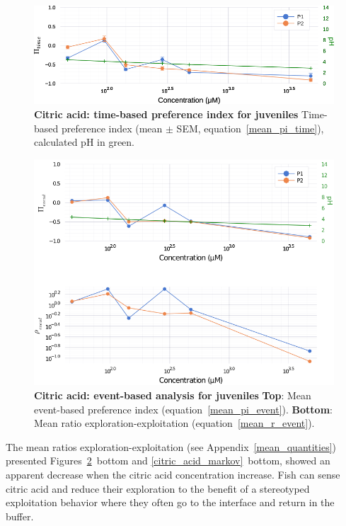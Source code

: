     \begin{figure}[h!]
      \centering
      \includegraphics[width=1\textwidth]{part_2/assets/citricacid.png}
      \caption{\textbf{Citric acid: time-based preference index for juveniles} Time-based preference index (mean $\pm$ SEM, equation~\ref{mean_pi_time}), calculated pH in green.}
      \label{citric_acid}
    \end{figure}
    \begin{figure}[h!]
      \centering
      \includegraphics[width=1\textwidth]{part_2/assets/citricacid_event.png}
      \caption{\textbf{Citric acid: event-based analysis for juveniles} \textbf{Top}: Mean event-based preference index (equation~\ref{mean_pi_event}). \textbf{Bottom}: Mean ratio exploration-exploitation (equation~\ref{mean_r_event}).}
      \label{citric_acid_event}
    \end{figure}

  The mean ratios exploration-exploitation (see Appendix~\ref{mean_quantities}) presented Figures~\ref{citric_acid_event}~bottom and \ref{citric_acid_markov}~bottom, showed an apparent decrease when the citric acid concentration increase. Fish can sense citric acid and reduce their exploration to the benefit of a stereotyped exploitation behavior where they often go to the interface and return in the buffer.

